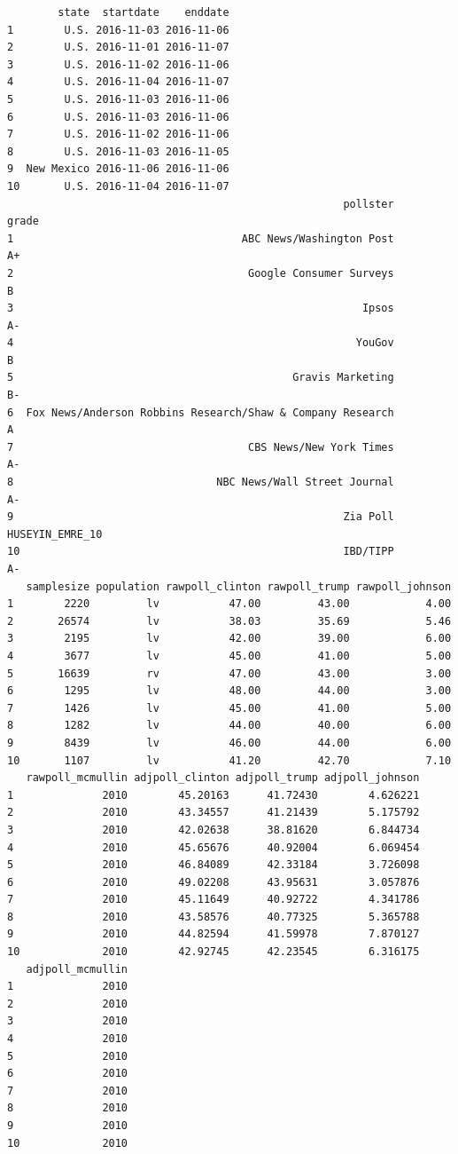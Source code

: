 \documentclass[
  letterpaper,
  DIV=11,
  numbers=noendperiod]{scrartcl}
\begin{document}
\begin{verbatim}
        state  startdate    enddate
1        U.S. 2016-11-03 2016-11-06
2        U.S. 2016-11-01 2016-11-07
3        U.S. 2016-11-02 2016-11-06
4        U.S. 2016-11-04 2016-11-07
5        U.S. 2016-11-03 2016-11-06
6        U.S. 2016-11-03 2016-11-06
7        U.S. 2016-11-02 2016-11-06
8        U.S. 2016-11-03 2016-11-05
9  New Mexico 2016-11-06 2016-11-06
10       U.S. 2016-11-04 2016-11-07
                                                     pollster           grade
1                                    ABC News/Washington Post              A+
2                                     Google Consumer Surveys               B
3                                                       Ipsos              A-
4                                                      YouGov               B
5                                            Gravis Marketing              B-
6  Fox News/Anderson Robbins Research/Shaw & Company Research               A
7                                     CBS News/New York Times              A-
8                                NBC News/Wall Street Journal              A-
9                                                    Zia Poll HUSEYIN_EMRE_10
10                                                   IBD/TIPP              A-
   samplesize population rawpoll_clinton rawpoll_trump rawpoll_johnson
1        2220         lv           47.00         43.00            4.00
2       26574         lv           38.03         35.69            5.46
3        2195         lv           42.00         39.00            6.00
4        3677         lv           45.00         41.00            5.00
5       16639         rv           47.00         43.00            3.00
6        1295         lv           48.00         44.00            3.00
7        1426         lv           45.00         41.00            5.00
8        1282         lv           44.00         40.00            6.00
9        8439         lv           46.00         44.00            6.00
10       1107         lv           41.20         42.70            7.10
   rawpoll_mcmullin adjpoll_clinton adjpoll_trump adjpoll_johnson
1              2010        45.20163      41.72430        4.626221
2              2010        43.34557      41.21439        5.175792
3              2010        42.02638      38.81620        6.844734
4              2010        45.65676      40.92004        6.069454
5              2010        46.84089      42.33184        3.726098
6              2010        49.02208      43.95631        3.057876
7              2010        45.11649      40.92722        4.341786
8              2010        43.58576      40.77325        5.365788
9              2010        44.82594      41.59978        7.870127
10             2010        42.92745      42.23545        6.316175
   adjpoll_mcmullin
1              2010
2              2010
3              2010
4              2010
5              2010
6              2010
7              2010
8              2010
9              2010
10             2010
\end{verbatim}
\end{document}
